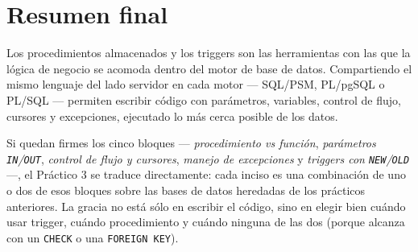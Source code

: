 \documentclass[11pt,a4paper]{article}
\begin{document}
\section*{Resumen final}

Los procedimientos almacenados y los triggers son las herramientas con
las que la lógica de negocio se acomoda dentro del motor de base de
datos. Compartiendo el mismo lenguaje del lado servidor en cada motor
--- SQL/PSM, PL/pgSQL o PL/SQL --- permiten escribir código con
parámetros, variables, control de flujo, cursores y excepciones,
ejecutado lo más cerca posible de los datos.

Si quedan firmes los cinco bloques --- \emph{procedimiento vs
función}, \emph{parámetros \texttt{IN}/\texttt{OUT}}, \emph{control
de flujo y cursores}, \emph{manejo de excepciones} y \emph{triggers
con \texttt{NEW}/\texttt{OLD}} ---, el Práctico 3 se traduce
directamente: cada inciso es una combinación de uno o dos de esos
bloques sobre las bases de datos heredadas de los prácticos
anteriores. La gracia no está sólo en escribir el código, sino en
elegir bien cuándo usar trigger, cuándo procedimiento y cuándo
ninguna de las dos (porque alcanza con un \texttt{CHECK} o una
\texttt{FOREIGN KEY}).
\end{document}
